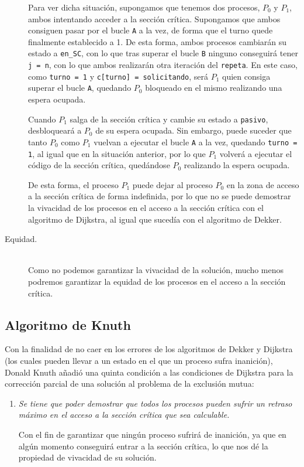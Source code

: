 \begin{description}
        Para ver dicha situación, supongamos que tenemos dos procesos, $P_0$ y $P_1$, ambos intentando acceder a la sección crítica. Supongamos que ambos consiguen pasar por el bucle \verb|A| a la vez, de forma que el turno quede finalmente establecido a 1. De esta forma, ambos procesos cambiarán su estado a \verb|en_SC|, con lo que tras superar el bucle \verb|B| ninguno conseguirá tener \verb|j = n|, con lo que ambos realizarán otra iteración del \verb|repeta|. En este caso, como \verb|turno = 1| y \verb|c[turno] = solicitando|, será $P_1$ quien consiga superar el bucle \verb|A|, quedando $P_0$ bloqueado en el mismo realizando una espera ocupada.

        Cuando $P_1$ salga de la sección crítica y cambie su estado a \verb|pasivo|, desbloqueará a $P_0$ de su espera ocupada. Sin embargo, puede suceder que tanto $P_0$ como $P_1$ vuelvan a ejecutar el bucle \verb|A| a la vez, quedando \verb|turno = 1|, al igual que en la situación anterior, por lo que $P_1$ volverá a ejecutar el código de la sección crítica, quedándose $P_0$ realizando la espera ocupada.

        De esta forma, el proceso $P_1$ puede dejar al proceso $P_0$ en la zona de acceso a la sección crítica de forma indefinida, por lo que no se puede demostrar la vivacidad de los procesos en el acceso a la sección crítica con el algoritmo de Dijkstra, al igual que sucedía con el algoritmo de Dekker.
    \item [Equidad.]~\\
        Como no podemos garantizar la vivacidad de la solución, mucho menos podremos garantizar la equidad de los procesos en el acceso a la sección crítica.
\end{description}

\subsection{Algoritmo de Knuth}
Con la finalidad de no caer en los errores de los algoritmos de Dekker y Dijkstra (los cuales pueden llevar a un estado en el que un proceso sufra inanición), Donald Knuth añadió una quinta condición a las condiciones de Dijkstra para la corrección parcial de una solución al problema de la exclusión mutua:
\begin{enumerate}[label=5.]
    \item \textit{Se tiene que poder demostrar que todos los procesos pueden sufrir un retraso máximo en el acceso a la sección crítica que sea calculable.}

        Con el fin de garantizar que ningún proceso sufrirá de inanición, ya que en algún momento conseguirá entrar a la sección crítica, lo que nos dé la propiedad de vivacidad de su solución.
\end{enumerate}

